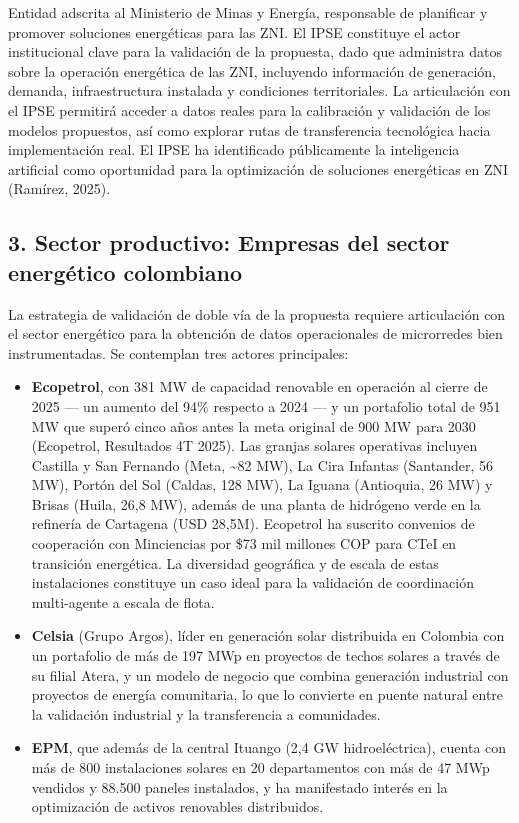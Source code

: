 \documentclass[12pt,letterpaper]{article}
\begin{document}
Entidad adscrita al Ministerio de Minas y Energ\'ia, responsable de planificar y promover soluciones energ\'eticas para las ZNI. El IPSE constituye el actor institucional clave para la validaci\'on de la propuesta, dado que administra datos sobre la operaci\'on energ\'etica de las ZNI, incluyendo informaci\'on de generaci\'on, demanda, infraestructura instalada y condiciones territoriales. La articulaci\'on con el IPSE permitir\'a acceder a datos reales para la calibraci\'on y validaci\'on de los modelos propuestos, as\'i como explorar rutas de transferencia tecnol\'ogica hacia implementaci\'on real. El IPSE ha identificado p\'ublicamente la inteligencia artificial como oportunidad para la optimizaci\'on de soluciones energ\'eticas en ZNI (Ram\'irez, 2025).

\subsection*{3. Sector productivo: Empresas del sector energ\'etico colombiano}

La estrategia de validaci\'on de doble v\'ia de la propuesta requiere articulaci\'on con el sector energ\'etico para la obtenci\'on de datos operacionales de microrredes bien instrumentadas. Se contemplan tres actores principales:

\begin{itemize}
\item \textbf{Ecopetrol}, con 381 MW de capacidad renovable en operaci\'on al cierre de 2025 --- un aumento del 94\% respecto a 2024 --- y un portafolio total de 951 MW que super\'o cinco a\~nos antes la meta original de 900 MW para 2030 (Ecopetrol, Resultados 4T 2025). Las granjas solares operativas incluyen Castilla y San Fernando (Meta, \textasciitilde82 MW), La Cira Infantas (Santander, 56 MW), Port\'on del Sol (Caldas, 128 MW), La Iguana (Antioquia, 26 MW) y Brisas (Huila, 26,8 MW), adem\'as de una planta de hidr\'ogeno verde en la refiner\'ia de Cartagena (USD 28,5M). Ecopetrol ha suscrito convenios de cooperaci\'on con Minciencias por \$73 mil millones COP para CTeI en transici\'on energ\'etica. La diversidad geogr\'afica y de escala de estas instalaciones constituye un caso ideal para la validaci\'on de coordinaci\'on multi-agente a escala de flota.

\item \textbf{Celsia} (Grupo Argos), l\'ider en generaci\'on solar distribuida en Colombia con un portafolio de m\'as de 197 MWp en proyectos de techos solares a trav\'es de su filial Atera, y un modelo de negocio que combina generaci\'on industrial con proyectos de energ\'ia comunitaria, lo que lo convierte en puente natural entre la validaci\'on industrial y la transferencia a comunidades.

\item \textbf{EPM}, que adem\'as de la central Ituango (2,4 GW hidroel\'ectrica), cuenta con m\'as de 800 instalaciones solares en 20 departamentos con m\'as de 47 MWp vendidos y 88.500 paneles instalados, y ha manifestado inter\'es en la optimizaci\'on de activos renovables distribuidos.
\end{itemize}
\end{document}

